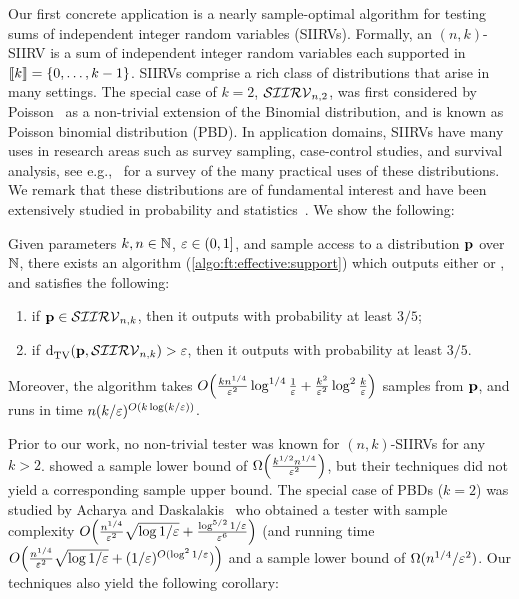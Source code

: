 Our first concrete application is a nearly sample-optimal algorithm for testing
sums of independent integer random variables (SIIRVs). 
Formally, an $(n, k)$-SIIRV is a sum of independent integer random variables each supported in $\modulo{k}=\{0,\dots,k-1\}$.
SIIRVs comprise a rich class of distributions that arise in many settings. The special case of $k=2$, $\classksiirv[n]{2}$,
was first considered by Poisson~\cite{Poisson:37} as a non-trivial extension of the Binomial distribution,
and is known as Poisson binomial distribution (PBD). In application domains, SIIRVs have many uses in research areas
such as survey sampling, case-control studies, and survival analysis, see e.g.,~\cite{CL:97} for a survey of the many practical uses of these distributions.
We remark that these distributions are of fundamental interest and have been extensively 
studied in probability and statistics~\cite{Chernoff:52,Hoeffding:63,DP:09, Presman:83,Kruopis:86,BHJ:92, CL10,CGS11}.
We show the following:

\begin{theorem}\label{theo:testing:ksiirv}
    Given parameters $k,n\in\N$, $\eps\in(0,1]$, and sample access to a distribution $\p$ over $\N$, there exists an algorithm (\cref{algo:ft:effective:support}) which outputs either \accept or \reject, and satisfies the following:
    \begin{enumerate}
        \item if $\p \in \classksiirv[n]{k}$, then it outputs \accept with probability at least $3/5$;
        \item if $\totalvardist{\p}{\classksiirv[n]{k}}>\eps$, then it outputs \reject with probability at least $3/5$.
    \end{enumerate}
    Moreover, the algorithm takes $\bigO{\frac{k n^{1/4}}{\eps^2}\log^{1/4}\frac{1}{\eps} + \frac{k^2}{\eps^2} \log^2\frac{k}{\eps}}$ samples from $\p$, and runs in time $n(k/\eps)^{\bigO{k\log(k/\eps)}}$.
\end{theorem}

Prior to our work, no non-trivial tester was known for $(n, k)$-SIIRVs for any $k>2$. 
\cite{CDGR:16} showed a sample lower bound of $\bigOmega{\frac{k^{1/2}n^{1/4}}{\eps^2}}$, but their techniques
did not yield a corresponding sample upper bound. The special case of PBDs ($k=2$) was studied by 
Acharya and Daskalakis~\cite{AD:15} who obtained a tester with sample complexity 
$\bigO{\frac{n^{1/4}}{\eps^2}\sqrt{\log1/\eps}+\frac{\log^{5/2}1/\eps}{\eps^6}}$ (and running time $\bigO{\frac{n^{1/4}}{\eps^2}\sqrt{\log1/\eps}+(1/\eps)^{O(\log^2 1/\eps})}$ and a sample lower bound of $\Omega(n^{1/4}/\eps^2)$. 
Our techniques also yield the following corollary: 


